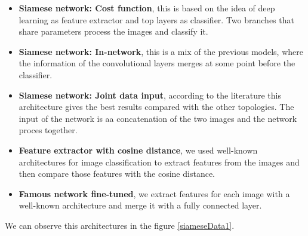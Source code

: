 \documentclass[12pt, a4paper, titlepage,twoside,openright]{article}
\begin{document}
\begin{itemize}


\item \textbf{Siamese network: Cost function}, this is based on the idea of deep learning as feature extractor and top layers as classifier. Two branches that share parameters process the images and classify it.

\item \textbf{Siamese network: In-network}, this is a mix of the previous models, where the information of the convolutional layers merges at some point before the classifier.

\item \textbf{Siamese network: Joint data input}, according to the literature this architecture gives the best results compared with the other topologies. The input of the network is aa concatenation of the two images and the network proces together.


\item \textbf{Feature extractor with cosine distance}, we used well-known architectures for image classification to extract features from the images and then compare those features with the cosine distance.

\item \textbf{Famous network fine-tuned}, we extract features for each image with a well-known architecture and merge it with a fully connected layer.

\end{itemize}

We can observe this architectures in the figure \ref{siameseData1}.
\end{document}
